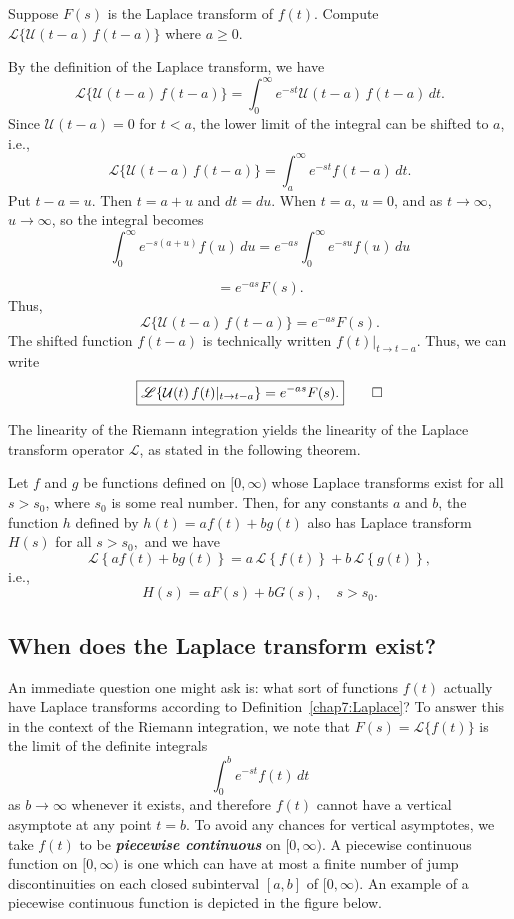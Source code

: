 \begin{example}\label{shiting-on-t-axis}
	 Suppose \( F(s) \) is the Laplace transform of \( f(t) \). Compute  \(\mathscr{L} \{\mathcal{U}(t - a)\, f(t - a) \}\) where \( a \ge 0 \).
\end{example}
\begin{solution}
By the definition of the Laplace transform, we have
	\[
	\mathscr{L}\{\mathcal{U}(t - a)\, f(t - a)\} = \int_0^\infty e^{-st} \mathcal{U}(t - a)\, f(t - a)\, dt.
	\]
	Since \( \mathcal{U}(t - a) = 0 \) for \( t < a \), the lower limit of the integral can be shifted to \( a \), i.e., 
	\[
	\mathscr{L}\{\mathcal{U}(t - a)\, f(t - a)\} = \int_a^\infty e^{-st} f(t - a)\, dt.
	\]
  Put \(t - a =u\). Then  \(t = a+u\) and \(dt = du.\)
	When \( t = a  \), \( u = 0 \), and as $t\to \infty$, $u\to\infty$, so the integral becomes
	\[\int_0^\infty e^{-s(a+u)} f(u)\, du = e^{-as} \int_0^\infty e^{-su} f(u)\, du
	\]
	
	\[
	= e^{-as} F(s).
	\]
	Thus,
	\[
	\boxed{\mathscr{L}\{\mathcal{U}(t - a)\, f(t - a)\} = e^{-as} F(s).}
	\]
	The shifted function $f(t-a)$ is technically written $f(t)\vert_{t\to t-a}.$  Thus, we can write
	\[
	\boxed{
		\mathscr{L}\{\mathcal{U}(t)\, f(t)\vert_{t\to t-a}\} = e^{-as} F(s).
	}\qedhere
	\]
\end{solution}

 The linearity  of the Riemann integration yields the linearity of the Laplace transform operator 
\(\mathscr{L}\), as stated in the following theorem.

\begin{theorem}
	Let $f$ and $g$ be functions defined on $[0, \infty)$ whose   Laplace transforms exist for all $s>s_0$, where $s_0$ is some real number. Then, for any constants $a$ and $b$, the function $h$ defined by $h(t) = af(t) + bg(t)$ also has Laplace transform $H(s)$ for all $s> s_0,$ and  we have
	\[\mathscr{L}\left\{ {af\left( t \right) + bg\left( t \right)} \right\} = a\,\mathscr{L}\left\{f (t)\right\} + b\,\mathscr{L}\left\{g (t)\right\},\] i.e.,
	\[H(s) = aF(s) + bG(s), \quad s>s_0.\]
\end{theorem} 

 \subsection{When does the Laplace transform exist?}
 An immediate question one might ask is: what sort of functions $f(t)$ actually have Laplace transforms according to Definition~\ref{chap7:Laplace}?
To answer this in the context of the Riemann integration, we note that $F(s) =\mathscr{L}\{f(t)\}$ is the limit of the definite integrals 
 	\[\int_0^b  e^{-st} f(t)\, dt\] 
 	as $b\to\infty$ whenever it exists,  and therefore
  $f(t)$ cannot have a vertical asymptote at any point $t =b$. To avoid any chances for vertical asymptotes, we  take $f(t)$ to be \textbf{\textit{piecewise continuous}} on $[0, \infty).$ A piecewise continuous function on \([0,\infty)\)  is one which can have at most a finite number of jump discontinuities on each closed subinterval \([a, b]\) of \([0,\infty)\).  An example of a piecewise continuous function is depicted in the figure below. \\
  
